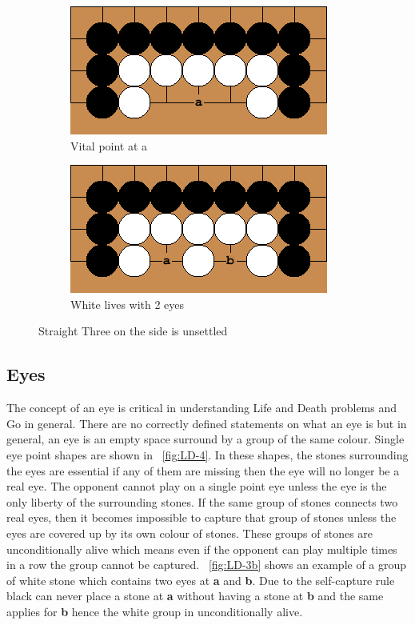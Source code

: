 \documentclass{l4proj}
\newcommand{\bo}[1]{\textbf{#1}}
\begin{document}
\begin{figure}[!ht]
\centering
\begin{subfigure}[b]{0.4\textwidth}
\includegraphics[width=\textwidth]{LD/3a.png}
\caption{Vital point at a}
\label{fig:LD-3a}
\end{subfigure}\qquad
\begin{subfigure}[b]{0.4\textwidth}
\includegraphics[width=\textwidth]{LD/3b.png}
\caption{White lives with 2 eyes}
\label{fig:LD-3b}
\end{subfigure}
\caption{Straight Three on the side is unsettled}
\label{fig:LD-3}
\end{figure}




\subsection{Eyes}
The concept of an eye is critical in understanding Life and Death problems and Go in general. There are no correctly defined statements on what an eye is but in general, an eye is an empty space surround by a group of the same colour. Single eye point shapes are shown in ~\autoref{fig:LD-4}. In these shapes, the stones surrounding the eyes are essential if any of them are missing then the eye will no longer be a real eye. The opponent cannot play on a single point eye unless the eye is the only liberty of the surrounding stones. If the same group of stones connects two real eyes, then it becomes impossible to capture that group of stones unless the eyes are covered up by its own colour of stones. These groups of stones are unconditionally alive which means even if the opponent can play multiple times in a row the group cannot be captured. ~\autoref{fig:LD-3b} shows an example of a group of white stone which contains two eyes at \bo{a} and \bo{b}. Due to the self-capture rule black can never place a stone at \bo{a} without having a stone at \bo{b} and the same applies for \bo{b} hence the white group in unconditionally alive.
\end{document}
